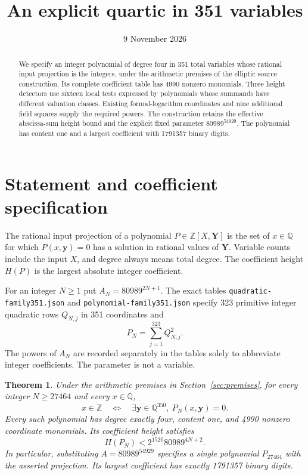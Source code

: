 \documentclass[11pt,a4paper]{article}
\title{An explicit quartic in 351 variables}
\author{}\date{9 November 2026}
\newtheorem{theorem}{Theorem}[section]
\theoremstyle{remark}\newtheorem{remark}[theorem]{Remark}
\newcommand{\Q}{\mathbb Q}\newcommand{\Z}{\mathbb Z}\newcommand{\HH}{\mathcal H}
\begin{document}
\maketitle
\begin{abstract}
We specify an integer polynomial of degree four in 351 total variables
whose rational input projection is the integers, under the arithmetic
premises of the elliptic source construction. Its complete coefficient
table has 4990 nonzero monomials. Three height detectors use sixteen
local tests expressed by polynomials whose summands have different
valuation classes. Existing formal-logarithm coordinates and nine
additional field squares supply the required powers. The construction retains
the effective abscissa-sum height bound and the explicit fixed parameter
$80989^{54929}$. The polynomial has content one and a largest coefficient
with 1791357 binary digits.
\end{abstract}

\section{Statement and coefficient specification}
The rational input projection of a polynomial $P\in\Z[X,\boldsymbol Y]$
is the set of $x\in\Q$ for which $P(x,\boldsymbol y)=0$ has a solution
in rational values of $\boldsymbol Y$. Variable counts include the input
$X$, and degree always means total degree. The coefficient height $H(P)$
is the largest absolute integer coefficient.

For an integer $N\ge1$ put $A_N=80989^{2N+1}$. The exact tables
\nolinkurl{quadratic-family351.json} and
\nolinkurl{polynomial-family351.json} specify 323 primitive integer
quadratic rows $Q_{N,j}$ in 351 coordinates and
\[
                    P_N=\sum_{j=1}^{323}Q_{N,j}^2.
\]
The powers of $A_N$ are recorded separately in the tables solely to
abbreviate integer coefficients. The parameter is not a variable.

\begin{theorem}\label{thm:main}
Under the arithmetic premises in Section~\ref{sec:premises}, for every
integer $N\ge27464$ and every $x\in\Q$,
\[
 x\in\Z\quad\Longleftrightarrow\quad
 \exists\boldsymbol y\in\Q^{350},\ P_N(x,\boldsymbol y)=0.
\]
Every such polynomial has degree exactly four, content one, and 4990
nonzero coordinate monomials. Its coefficient height satisfies
\[
                         H(P_N)<2^{1520}80989^{4N+2}.
\]
In particular, substituting $A=80989^{54929}$ specifies a single
polynomial $P_{27464}$ with the asserted projection. Its largest
coefficient has exactly 1791357 binary digits.
\end{theorem}
\end{document}
